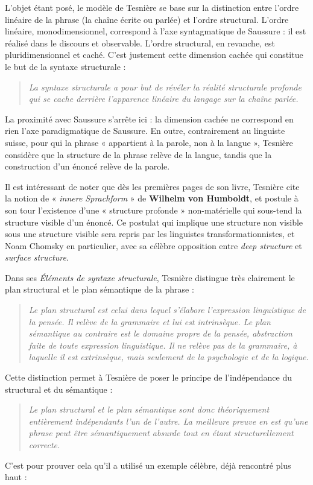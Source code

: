 L’objet étant posé, le modèle de Tesnière se base sur la distinction entre l’ordre linéaire de la phrase (la chaîne écrite ou parlée) et l’ordre structural. L’ordre linéaire, monodimensionnel, correspond à l’axe syntagmatique de Saussure : il est réalisé dans le discours et observable. L’ordre structural, en revanche, est pluridimensionnel et caché. C’est justement cette dimension cachée qui constitue le but de la syntaxe structurale :
\begin{quote}\small\itshape
La syntaxe structurale a pour but de révéler la réalité structurale profonde qui se cache derrière l’apparence linéaire du langage sur la chaîne parlée.
\end{quote}
La proximité avec Saussure s’arrête ici : la dimension cachée ne correspond en rien l’axe paradigmatique de Saussure. En outre, contrairement au linguiste suisse, pour qui la phrase « appartient à la parole, non à la langue », Tesnière considère que la structure de la phrase relève de la langue, tandis que la construction d’un énoncé relève de la parole.

Il est intéressant de noter que dès les premières pages de son livre, Tesnière cite la notion de « \textit{innere Sprachform} » de \textbf{Wilhelm von Humboldt}, et postule à son tour l’existence d’une « structure profonde » non-matérielle qui sous-tend la structure visible d’un énoncé. Ce postulat qui implique une structure non visible sous une structure visible sera repris par les linguistes transformationnistes, et Noam Chomsky en particulier, avec sa célèbre opposition entre \textit{deep structure} et \textit{surface structure}.

Dans ses \textit{Éléments de syntaxe structurale}, Tesnière distingue très clairement le plan structural et le plan sémantique de la phrase :
\begin{quote}\small\itshape
Le plan structural est celui dans lequel s’élabore l’expression linguistique de la pensée. Il relève de la grammaire et lui est intrinsèque. Le plan sémantique au contraire est le domaine propre de la pensée, abstraction faite de toute expression linguistique. Il ne relève pas de la grammaire, à laquelle il est extrinsèque, mais seulement de la psychologie et de la logique.
\end{quote}
Cette distinction permet à Tesnière de poser le principe de l’indépendance du structural et du sémantique :
\begin{quote}\small\itshape
Le plan structural et le plan sémantique sont donc théoriquement entièrement indépendants l’un de l’autre. La meilleure preuve en est qu’une phrase peut être sémantiquement absurde tout en étant structurellement correcte.
\end{quote}
C’est pour prouver cela qu’il a utilisé un exemple célèbre, déjà rencontré plus haut :

